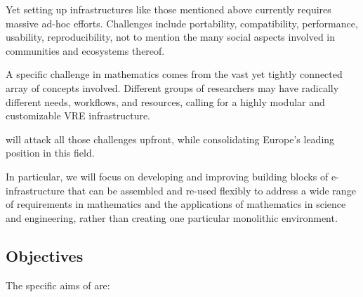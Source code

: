 \documentclass[noworkareas,deliverables,keys]{euproposal}                  %
\begin{document}
\begin{proposal}
Yet setting up infrastructures like those mentioned above currently requires massive
ad-hoc efforts. Challenges include portability, compatibility, performance, usability,
reproducibility, not to mention the many social aspects involved in communities and
ecosystems thereof.

A specific challenge in mathematics comes from the vast yet tightly connected array of
concepts involved. Different groups of researchers may have radically different needs,
workflows, and resources, calling for a highly modular and customizable VRE
infrastructure.

\TheProject will attack all those challenges upfront, while consolidating Europe's leading
position in this field.


In particular, we will focus on developing and improving building
blocks of e-infrastructure that can be assembled and re-used flexibly
to address a wide range of requirements in mathematics and the
applications of mathematics in science and engineering, rather than
creating one particular monolithic environment.



\subsection{Objectives}
\label{sect:objectives}


The specific aims of \TheProject are:



\end{proposal}
\end{document}
